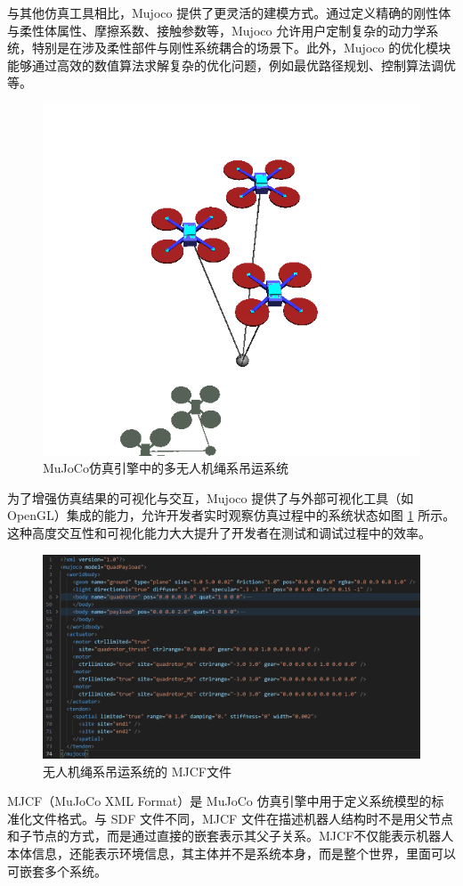 \documentclass[lang=chs, degree=master, blindreview=false, winfonts=true]{yanputhesis}
\begin{document}
与其他仿真工具相比，Mujoco 提供了更灵活的建模方式。通过定义精确的刚性体与柔性体属性、摩擦系数、接触参数等，Mujoco 允许用户定制复杂的动力学系统，特别是在涉及柔性部件与刚性系统耦合的场景下。此外，Mujoco 的优化模块能够通过高效的数值算法求解复杂的优化问题，例如最优路径规划、控制算法调优等。

\begin{figure}[hbt!]
	\centering
	\includegraphics[width=34pc]{picture/5_3.png} 
	\caption{MuJoCo仿真引擎中的多无人机绳系吊运系统} 
	\label{5_3}
\end{figure}

为了增强仿真结果的可视化与交互，Mujoco 提供了与外部可视化工具（如 OpenGL）集成的能力，允许开发者实时观察仿真过程中的系统状态如图 \ref{5_3} 所示。这种高度交互性和可视化能力大大提升了开发者在测试和调试过程中的效率。

\begin{figure}[hbt!]
	\centering
	\includegraphics[width=36pc]{picture/MJCF.png} 
	\caption{无人机绳系吊运系统的 MJCF文件} 
	\label{MJCF}
\end{figure}
MJCF（MuJoCo XML Format）是 MuJoCo 仿真引擎中用于定义系统模型的标准化文件格式。与 SDF 文件不同，MJCF 文件在描述机器人结构时不是用父节点和子节点的方式，而是通过直接的嵌套表示其父子关系。MJCF不仅能表示机器人本体信息，还能表示环境信息，其主体并不是系统本身，而是整个世界，里面可以可嵌套多个系统。
\end{document}
